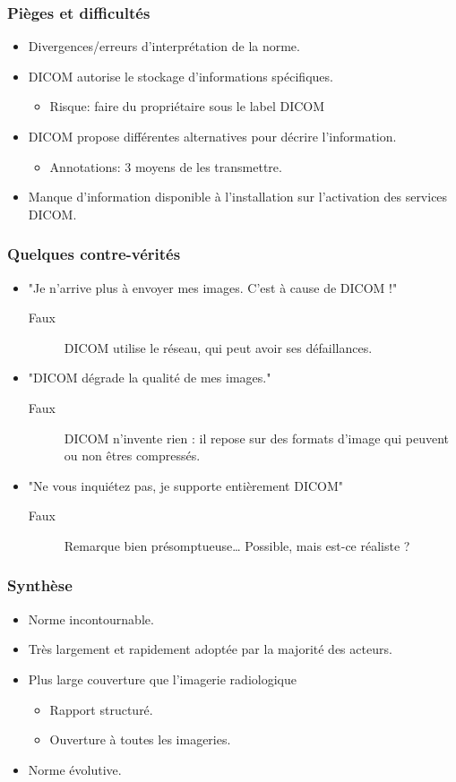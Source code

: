 \frame
{
	\frametitle{Pi\`eges et difficult\'es}
	\begin{itemize}
		\item Divergences/erreurs d'interpr\'etation de la norme.
		\item DICOM autorise le stockage d'informations sp\'ecifiques.
		\begin{itemize}
			\item Risque: faire du propri\'etaire sous le label DICOM
		\end{itemize}
		\item DICOM propose diff\'erentes alternatives pour d\'ecrire l'information.
		\begin{itemize}
			\item Annotations: 3 moyens de les transmettre.
		\end{itemize}
		\item Manque d'information disponible \`a l'installation sur l'activation des services DICOM.
	\end{itemize}
}

\frame
{
	\frametitle{Quelques contre-v\'erit\'es}
	\begin{itemize}
		\item "Je n'arrive plus \`a envoyer mes images. C'est \`a cause de DICOM !"
		\begin{description}
			\item[Faux] DICOM utilise le r\'eseau, qui peut avoir ses d\'efaillances.
		\end{description}
		\item "DICOM d\'egrade la qualit\'e de mes images."
		\begin{description}
			\item[Faux] DICOM n'invente rien : il repose sur des formats d'image qui peuvent ou non \^etres compress\'es.
		\end{description}
		\item "Ne vous inqui\'etez pas, je supporte enti\`erement DICOM"
		\begin{description}
			\item[Faux] Remarque bien pr\'esomptueuse\ldots
			Possible, mais est-ce r\'ealiste ?
		\end{description}
	\end{itemize}
}

\frame
{
	\frametitle{Synth\`ese}
	\begin{itemize}
		\item Norme incontournable.
		\item Tr\`es largement et rapidement adopt\'ee par la majorit\'e des acteurs.
		\item Plus large couverture que l'imagerie radiologique
		\begin{itemize}
			\item Rapport structur\'e.
			\item Ouverture \`a toutes les imageries.
		\end{itemize}
		\item Norme \'evolutive.
	\end{itemize}
}
